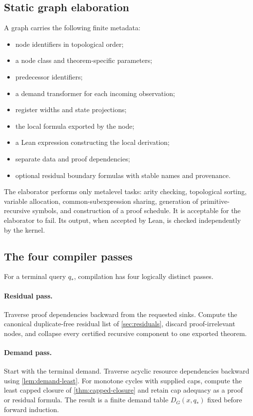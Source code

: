 \subsection{Static graph elaboration}

A \KIFCR graph carries the following finite metadata:
\begin{itemize}
  \item node identifiers in topological order;
  \item a node class and theorem-specific parameters;
  \item predecessor identifiers;
  \item a demand transformer for each incoming observation;
  \item register widths and state projections;
  \item the local formula exported by the node;
  \item a Lean expression constructing the local derivation;
  \item separate data and proof dependencies;
  \item optional residual boundary formulas with stable names and provenance.
\end{itemize}
The elaborator performs only metalevel tasks: arity checking, topological sorting, variable allocation, common-subexpression sharing, generation of primitive-recursive symbols, and construction of a proof schedule.  It is acceptable for the elaborator to fail.  Its output, when accepted by Lean, is checked independently by the kernel.

\subsection{The four compiler passes}

For a terminal query \(q_*\), compilation has four logically distinct passes.

\paragraph{Residual pass.}
Traverse proof dependencies backward from the requested sinks.  Compute the canonical duplicate-free residual list of \cref{sec:residuals}, discard proof-irrelevant nodes, and collapse every certified recursive component to one exported theorem.

\paragraph{Demand pass.}
Start with the terminal demand.  Traverse acyclic resource dependencies backward using \cref{lem:demand-least}.  For monotone cycles with supplied caps, compute the least capped closure of \cref{thm:capped-closure} and retain cap adequacy as a proof or residual formula.  The result is a finite demand table \(D_G(x,q_*)\) fixed before forward induction.

